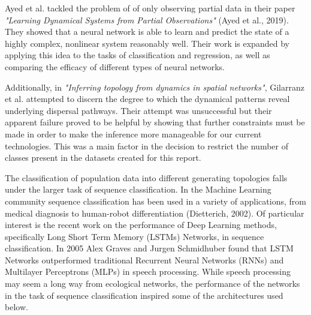 \documentclass[letterpaper, 10 pt, conference]{ieeeconf}  %
\begin{document}
    Ayed et al. tackled the problem of of only observing partial data in their paper \textit{"Learning Dynamical Systems from Partial Observations"} (Ayed et al., 2019). They showed that a neural network is able to learn and predict the state of a highly complex, nonlinear system reasonably well. Their work is expanded by applying this idea to the tasks of classification and regression, as well as comparing the efficacy of different types of neural networks.
  
	Additionally, in \textit{"Inferring topology from dynamics in spatial networks"}, Gilarranz et al. attempted to discern the degree to which the dynamical patterns reveal underlying dispersal pathways. Their attempt was unsuccessful but their apparent failure proved to be helpful by showing that further constraints must be made in order to make the inference more manageable for our current technologies. This was a main factor in the decision to restrict the number of classes present in the datasets created for this report. 

	The classification of population data into different generating topologies falls under the larger task of sequence classification. In the Machine Learning community sequence classification has been used in a variety of applications, from medical diagnosis to human-robot differentiation (Dietterich, 2002). Of particular interest is the recent work on the performance of Deep Learning methods, specifically Long Short Term Memory (LSTMs) Networks, in sequence classification. In 2005 Alex Graves and Jurgen Schmidhuber found that LSTM Networks outperformed traditional Recurrent Neural Networks (RNNs) and Multilayer Perceptrons (MLPs) in speech processing. While speech processing may seem a long way from ecological networks, the performance of the networks in the task of sequence classification inspired some of the architectures used below. 

\end{document}
